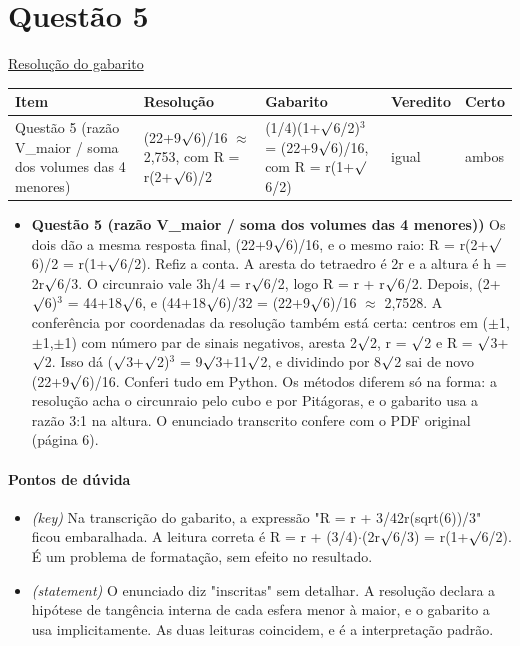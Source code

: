 \documentclass{article}%
\begin{document}
\section*{Questão 5}%
\href{https://poliedroresolve.sistemapoliedro.com.br/vestibulares/ita/2026/ita-2-fase-dia-1-28-10-2025-2-fase-dia-1/dissertativa-5-matematica-2-fase-dia-1-ita-2026}{Resolução do gabarito}\par\smallskip%
\begin{longtable}{@{}p{} p{} p{} p{} p{}@{}}\toprule Item & Resolução & Gabarito & Veredito & Certo \\ \midrule
Questão 5 (razão V\_maior / soma dos volumes das 4 menores) & (22+9$\surd$6)/16 $\approx$ 2,753, com R = r(2+$\surd$6)/2 & (1/4)(1+$\surd$6/2)$^3$ = (22+9$\surd$6)/16, com R = r(1+$\surd$6/2) & igual & ambos \\
\bottomrule\end{longtable}%
\begin{itemize}%
\item%
\textbf{Questão 5 (razão V\_maior / soma dos volumes das 4 menores))} Os dois dão a mesma resposta final, (22+9$\surd$6)/16, e o mesmo raio: R = r(2+$\surd$6)/2 = r(1+$\surd$6/2). Refiz a conta. A aresta do tetraedro é 2r e a altura é h = 2r$\surd$6/3. O circunraio vale 3h/4 = r$\surd$6/2, logo R = r + r$\surd$6/2. Depois, (2+$\surd$6)$^3$ = 44+18$\surd$6, e (44+18$\surd$6)/32 = (22+9$\surd$6)/16 $\approx$ 2,7528. A conferência por coordenadas da resolução também está certa: centros em ($\pm$1,$\pm$1,$\pm$1) com número par de sinais negativos, aresta 2$\surd$2, r = $\surd$2 e R = $\surd$3+$\surd$2. Isso dá ($\surd$3+$\surd$2)$^3$ = 9$\surd$3+11$\surd$2, e dividindo por 8$\surd$2 sai de novo (22+9$\surd$6)/16. Conferi tudo em Python. Os métodos diferem só na forma: a resolução acha o circunraio pelo cubo e por Pitágoras, e o gabarito usa a razão 3:1 na altura. O enunciado transcrito confere com o PDF original (página 6).%
\end{itemize}%
\paragraph{Pontos de dúvida}%
\begin{itemize}%
\item%
\textit{(key)} Na transcrição do gabarito, a expressão "R = r + 3/42r(sqrt(6))/3" ficou embaralhada. A leitura correta é R = r + (3/4)$\cdot$(2r$\surd$6/3) = r(1+$\surd$6/2). É um problema de formatação, sem efeito no resultado.%
\item%
\textit{(statement)} O enunciado diz "inscritas" sem detalhar. A resolução declara a hipótese de tangência interna de cada esfera menor à maior, e o gabarito a usa implicitamente. As duas leituras coincidem, e é a interpretação padrão.%
\end{itemize}%
\end{document}
